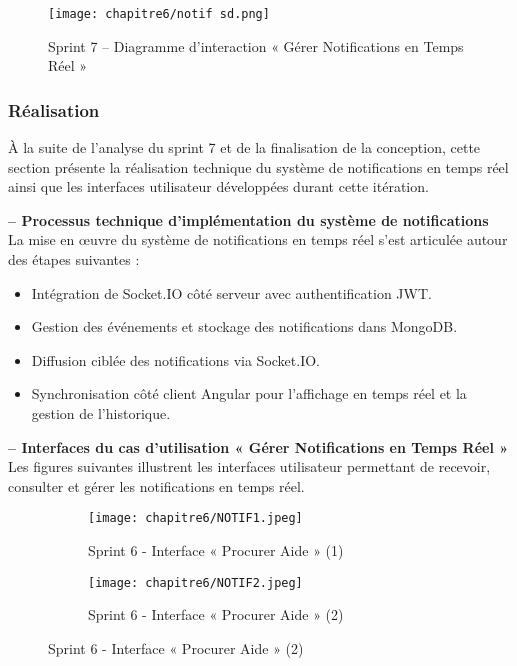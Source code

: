 \begin{figure}[H]
\centering
\texttt{[image: chapitre6/notif sd.png]}
\caption{Sprint 7 – Diagramme d’interaction « Gérer Notifications en Temps Réel »}
\end{figure}

\subsubsection{Réalisation}
À la suite de l’analyse du sprint 7 et de la finalisation de la conception, cette section présente la réalisation technique du système de notifications en temps réel ainsi que les interfaces utilisateur développées durant cette itération.

\textbf{– Processus technique d’implémentation du système de notifications}\\
La mise en œuvre du système de notifications en temps réel s’est articulée autour des étapes suivantes :
\begin{itemize}
    \item Intégration de Socket.IO côté serveur avec authentification JWT.
    \item Gestion des événements et stockage des notifications dans MongoDB.
    \item Diffusion ciblée des notifications via Socket.IO.
    \item Synchronisation côté client Angular pour l’affichage en temps réel et la gestion de l’historique.
\end{itemize}

\textbf{– Interfaces du cas d’utilisation « Gérer Notifications en Temps Réel »}\\
Les figures suivantes illustrent les interfaces utilisateur permettant de recevoir, consulter et gérer les notifications en temps réel.

\begin{figure}[H]
    \centering
    \begin{subfigure}{0.45\textwidth}
        \centering
        \texttt{[image: chapitre6/NOTIF1.jpeg]}
        \caption{Sprint 6 - Interface « Procurer Aide » (1)}
    \end{subfigure}
    \hfill
    \begin{subfigure}{0.45\textwidth}
        \centering
        \texttt{[image: chapitre6/NOTIF2.jpeg]}
        \caption{Sprint 6 - Interface « Procurer Aide » (2)}
    \end{subfigure}

    \vspace{0.5cm} %
\end{figure}


